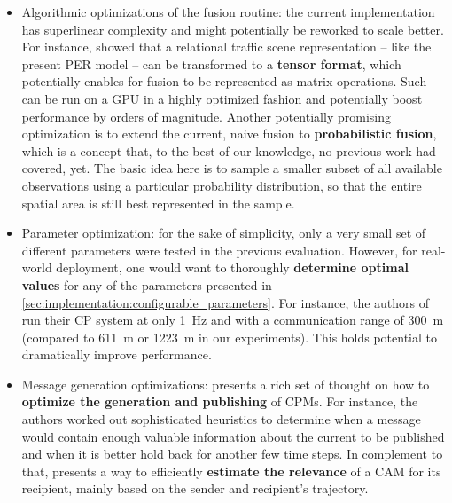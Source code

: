 \begin{itemize}
	\item Algorithmic optimizations of the fusion routine: the current implementation has superlinear complexity and might potentially be reworked to scale better. For instance, \cite{Petrich2018} showed that a relational traffic scene representation – like the present PER model – can be transformed to a \textbf{tensor format}, which potentially enables for fusion to be represented as matrix operations. Such can be run on a GPU in a highly optimized fashion and potentially boost performance by orders of magnitude. Another potentially promising optimization is to extend the current, naive fusion to \textbf{probabilistic fusion}, which is a concept that, to the best of our knowledge, no previous work had covered, yet. The basic idea here is to sample a smaller subset of all available observations using a particular probability distribution, so that the entire spatial area is still best represented in the sample. 
	\item Parameter optimization: for the sake of simplicity, only a very small set of different parameters were tested in the previous evaluation. However, for real-world deployment, one would want to thoroughly \textbf{determine optimal values} for any of the parameters presented in \cref{sec:implementation:configurable_parameters}. For instance, the authors of \cite{Gunther2015} run their CP system at only \SI{1}{\hertz} and with a communication range of \SI{300}{\meter} (compared to \SI{611}{\meter} or \SI{1223}{\meter} in our experiments). This holds potential to dramatically improve performance.
	\item Message generation optimizations: \cite{Thandavarayan2019} presents a rich set of thought on how to \textbf{optimize the generation and publishing} of CPMs. For instance, the authors worked out sophisticated heuristics to determine when a message would contain enough valuable information about the current to be published and when it is better hold back for another few time steps. In complement to that, \cite{Breu2013} presents a way to efficiently \textbf{estimate the relevance} of a CAM for its recipient, mainly based on the sender and recipient's trajectory.
\end{itemize}
\par
\bigskip

